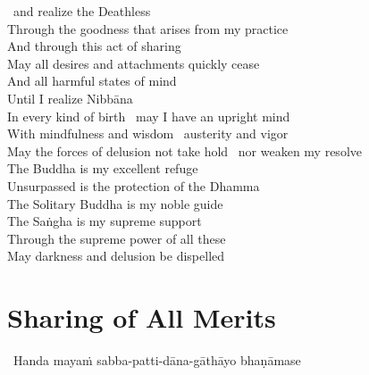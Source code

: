 \begin{english}
  \breathmark\ and realize the Deathless\\
  Through the goodness that arises from my practice\\
  And through this act of sharing\\
  May all desires and attachments quickly cease\\
  And all harmful states of mind\\
  Until I realize Nibbāna\\
  In every kind of birth \breathmark\ may I have an upright mind\\
  With mindfulness and wisdom \breathmark\ austerity and vigor\\
  May the forces of delusion\hyperlink{endnote135-appendix}{\hypertarget{endnote135-body}{}}
  not take hold \breathmark\ nor weaken my resolve\\
  The Buddha is my excellent refuge\\
  Unsurpassed is the protection of the Dhamma\\
  The Solitary Buddha is my noble guide\hyperlink{endnote136-appendix}{\hypertarget{endnote136-body}{}}\\
  The Saṅgha is my supreme support\\
  Through the supreme power of all these\\
  May darkness and delusion be dispelled\hyperlink{endnote137-appendix}{\hypertarget{endnote137-body}{}}
\end{english}

\suttaRef{[Trad]}


\section{Sharing of All Merits}
\label{sharing-all-merits}

\begin{leader}
  \anglebracketleft\ \hspace{-0.5mm}Handa mayaṁ sabba-patti-dāna-gāthāyo bhaṇāmase \hspace{-0.5mm}\anglebracketright\
\end{leader}

